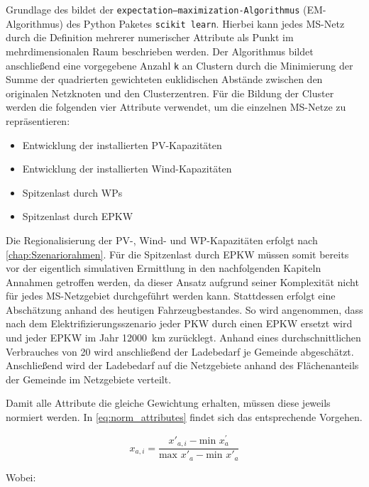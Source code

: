 Grundlage des \kmeans bildet der \texttt{expectation–maximization-Algorithmus} (EM-Algorithmus) des Python Paketes \texttt{scikit learn}. \cite{scikit-learn2011}
Hierbei kann jedes \gls{MS}-Netz durch die Definition mehrerer numerischer Attribute als Punkt im mehrdimensionalen Raum beschrieben werden.
Der Algorithmus bildet anschließend eine vorgegebene Anzahl \texttt{k} an Clustern durch die Minimierung der Summe der quadrierten gewichteten euklidischen Abstände zwischen den originalen Netzknoten und den Clusterzentren.
Für die Bildung der Cluster werden die folgenden vier Attribute verwendet, um die einzelnen \gls{MS}-Netze zu repräsentieren:

\begin{itemize}
	\item Entwicklung der installierten \gls{PV}-Kapazitäten
	\item Entwicklung der installierten Wind-Kapazitäten
	\item Spitzenlast durch \glspl{WP}
	\item Spitzenlast durch \gls{EPKW}
\end{itemize}

Die Regionalisierung der \gls{PV}-, Wind- und \gls{WP}-Kapazitäten erfolgt nach \autoref{chap:Szenariorahmen}.
Für die Spitzenlast durch \gls{EPKW} müssen somit bereits vor der eigentlich simulativen Ermittlung in den nachfolgenden Kapiteln Annahmen getroffen werden, da dieser Ansatz aufgrund seiner Komplexität nicht für jedes \gls{MS}-Netzgebiet durchgeführt werden kann.
Stattdessen erfolgt eine Abschätzung anhand des heutigen Fahrzeugbestandes.
So wird angenommen, dass nach dem Elektrifizierungsszenario jeder \gls{PKW} durch einen \gls{EPKW} ersetzt wird und jeder \gls{EPKW} im Jahr \SI{12000}{\km} zurücklegt.
Anhand eines durchschnittlichen Verbrauches von \SI{20}{\kwhkm} wird anschließend der Ladebedarf je Gemeinde abgeschätzt.
Anschließend wird der Ladebedarf auf die Netzgebiete anhand des Flächenanteils der Gemeinde im Netzgebiete verteilt.\medskip

Damit alle Attribute die gleiche Gewichtung erhalten, müssen diese jeweils normiert werden.
In \autoref{eq:norm_attributes} findet sich das entsprechende Vorgehen.

\begin{equation}
	x_{a, i} = \frac{x'_{a, i} - \text{min~} x^{'}_a}{\text{max~} x'_a - \text{min~} x'_a}
	\label{eq:norm_attributes}
\end{equation}

\noindent Wobei:

